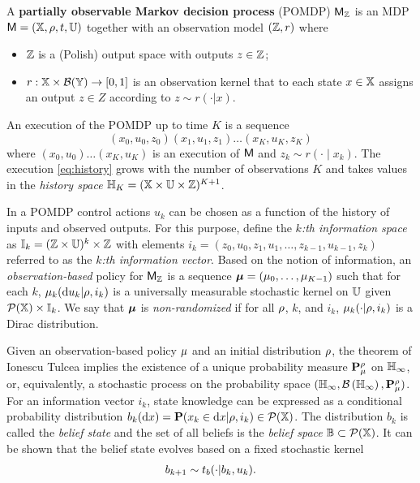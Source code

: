 \documentclass{ifacconf}
\begin{document}
\begin{definition}
\label{def:POMDP}

A \textbf{partially observable Markov decision process} (POMDP) $\mathsf{M}_{{\mathbb{Z}}}$ is an MDP $\mathsf{M} = ({\mathbb{X}}, \rho, t, {\mathbb{U}})$ together with an observation model $({\mathbb{Z}}, r)$ where
\begin{itemize}
	\item ${\mathbb{Z}}$ is a (Polish) output space with outputs $z \in {\mathbb{Z}}$;
  \item $r : {\mathbb{X}} \times \mathcal B({\mathbb{Y}}) \rightarrow [0,1]$ is an observation kernel that to each state $x \in {\mathbb{X}}$ assigns an output $z \in Z$ according to $z\sim r(\cdot|x)$.
\end{itemize}
\end{definition}

An execution of the POMDP up to time $K$ is a sequence
\begin{equation}
\label{eq:history}
  (x_0,u_0,z_0) (x_1,u_1,z_1) \ldots (x_K,u_K,z_K)
\end{equation}
where $(x_0, u_0) \ldots (x_K, u_K)$ is an execution of $\mathsf{M}$ and $z_k \sim r(\cdot \mid x_k)$. The execution \eqref{eq:history} grows with the number of observations $K$ and takes values in the \emph{history space} ${\mathbb{H}}_K = ({\mathbb{X}} \times {\mathbb{U}} \times {\mathbb{Z}})^{K+1}$.

In a POMDP control actions $u_k$ can be chosen as a function of the history of inputs and observed outputs. For this purpose, define the \emph{$k$:th information space} as ${\mathbb{I}}_k = ({\mathbb{Z}} \times {\mathbb{U}})^{k} \times {\mathbb{Z}}$ with elements $i_k = (z_0,u_0,z_1,u_1,\ldots,z_{k-1}, u_{k-1}, z_k)$ referred to as the \emph{$k$:th information vector}. Based on the notion of information, an \emph{observation-based} policy for $\mathsf{M}_{{\mathbb{Z}}}$ is a sequence ${\boldsymbol{\mu}}=({\mu}_0,\ldots,{\mu}_{K-1})$ such that for each $k$, ${\mu}_k( \mathrm{d} u_k|\rho, i_k)$ is a universally measurable stochastic kernel on ${\mathbb{U}}$  given $\mathcal{P}({\mathbb{X}})\times {\mathbb{I}}_k$. We say that ${\boldsymbol{\mu}}$ is \emph{non-randomized} if for all $\rho$, $k$, and $i_k$, ${\mu}_k(\cdot|\rho, i_k)$ is a Dirac distribution. %

Given an observation-based policy ${\mu}$ and an initial distribution $\rho$, the theorem of Ionescu Tulcea \citep{hll1996} implies the existence of a unique probability measure $\mathbf{P}_{\mu}^\rho$ on ${\mathbb{H}}_\infty$, or, equivalently, a stochastic process on the probability space $({\mathbb{H}}_\infty, \mathcal{B}\left({\mathbb{H}}_\infty\right), \mathbf{P}_{\mu}^\rho)$. For an information vector $i_k$, state knowledge can be expressed as a conditional probability distribution $b_k( \mathrm{d} x )=\mathbf{P}(x_k\in \mathrm{d} x |\rho,i_k)\in \mathcal P ({\mathbb{X}})$. The distribution $b_k$ is called the \emph{belief state} and the set of all beliefs is the \emph{belief space} $\mathbb{B}\subset \mathcal P({\mathbb{X}})$. It can be shown that the belief state evolves based on a fixed stochastic kernel
\begin{align}
\label{eq:trb}
	 b_{k+1} \sim t_b(\cdot|b_k,u_k).
\end{align}
\end{document}
